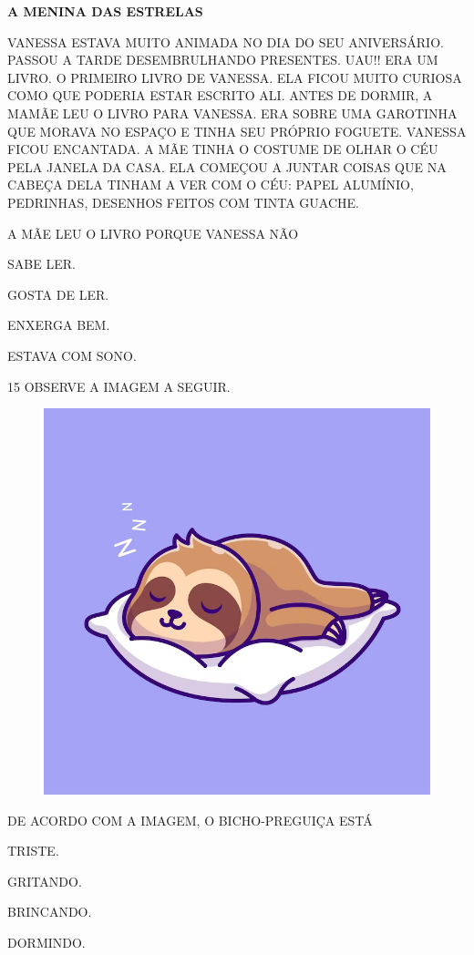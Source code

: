 \begin{myquote}
\textbf{A MENINA DAS ESTRELAS}

VANESSA ESTAVA MUITO ANIMADA NO DIA DO SEU ANIVERSÁRIO. PASSOU A TARDE DESEMBRULHANDO PRESENTES. UAU!! ERA UM LIVRO. O PRIMEIRO LIVRO DE VANESSA. ELA FICOU MUITO CURIOSA COMO QUE PODERIA ESTAR ESCRITO ALI.
ANTES DE DORMIR, A MAMÃE LEU O LIVRO PARA VANESSA. ERA SOBRE UMA GAROTINHA QUE MORAVA NO ESPAÇO E TINHA SEU PRÓPRIO FOGUETE. VANESSA FICOU ENCANTADA. A MÃE TINHA O COSTUME DE OLHAR O CÉU PELA JANELA DA CASA. ELA COMEÇOU A JUNTAR COISAS QUE NA CABEÇA DELA TINHAM A VER COM O CÉU: PAPEL ALUMÍNIO, PEDRINHAS, DESENHOS FEITOS COM TINTA GUACHE.

\end{myquote}

A MÃE LEU O LIVRO PORQUE VANESSA NÃO

\begin{escolha}

\item SABE LER.

\item GOSTA DE LER.

\item ENXERGA BEM.

\item ESTAVA COM SONO.

\end{escolha}

\num{15} OBSERVE A IMAGEM A SEGUIR.

\begin{figure}[H]
\centering
\includegraphics[width=.8\textwidth]{./media/image245.png}
\end{figure}

DE ACORDO COM A IMAGEM, O BICHO-PREGUIÇA ESTÁ

\begin{escolha}

\item TRISTE.

\item GRITANDO.

\item BRINCANDO.

\item DORMINDO.

\end{escolha}